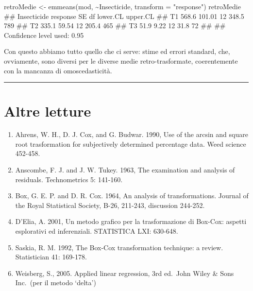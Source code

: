 \documentclass[a4paper,12pt,oneside]{book}
\providecommand{\tightlist}{%
  \setlength{\itemsep}{0pt}\setlength{\parskip}{0pt}}
\newenvironment{Shaded}{\begin{snugshade}}{\end{snugshade}}
\newcommand{\SpecialCharTok}[1]{#1}
\newcommand{\StringTok}[1]{#1}
\newcommand{\DocumentationTok}[1]{#1}
\newcommand{\OtherTok}[1]{#1}
\newcommand{\FunctionTok}[1]{#1}
\newcommand{\AttributeTok}[1]{#1}
\newcommand{\NormalTok}[1]{#1}
\begin{document}
\begin{Shaded}
\begin{Highlighting}[]
\NormalTok{retroMedie }\OtherTok{\textless{}{-}} \FunctionTok{emmeans}\NormalTok{(mod, }\SpecialCharTok{\textasciitilde{}}\NormalTok{Insecticide, }\AttributeTok{transform =} \StringTok{"response"}\NormalTok{)}
\NormalTok{retroMedie}
\DocumentationTok{\#\#  Insecticide response     SE df lower.CL upper.CL}
\DocumentationTok{\#\#  T1             568.6 101.01 12    348.5      789}
\DocumentationTok{\#\#  T2             335.1  59.54 12    205.4      465}
\DocumentationTok{\#\#  T3              51.9   9.22 12     31.8       72}
\DocumentationTok{\#\# }
\DocumentationTok{\#\# Confidence level used: 0.95}
\end{Highlighting}
\end{Shaded}

Con questo abbiamo tutto quello che ci serve: stime ed errori standard, che, ovviamente, sono diversi per le diverse medie retro-trasformate, coerentemente con la mancanza di omoscedasticità.

\begin{center}\rule{0.5\linewidth}{0.5pt}\end{center}

\hypertarget{altre-letture-7}{%
\section{Altre letture}\label{altre-letture-7}}

\begin{enumerate}
\def\labelenumi{\arabic{enumi}.}
\tightlist
\item
  Ahrens, W. H., D. J. Cox, and G. Budwar. 1990, Use of the arcsin and square root trasformation for subjectively determined percentage data. Weed science 452-458.
\item
  Anscombe, F. J. and J. W. Tukey. 1963, The examination and analysis of residuals. Technometrics 5: 141-160.
\item
  Box, G. E. P. and D. R. Cox. 1964, An analysis of transformations. Journal of the Royal Statistical Society, B-26, 211-243, discussion 244-252.
\item
  D'Elia, A. 2001, Un metodo grafico per la trasformazione di Box-Cox: aspetti esplorativi ed inferenziali. STATISTICA LXI: 630-648.
\item
  Saskia, R. M. 1992, The Box-Cox transformation technique: a review. Statistician 41: 169-178.
\item
  Weisberg, S., 2005. Applied linear regression, 3rd ed.~John Wiley \& Sons Inc.~(per il metodo `delta')
\end{enumerate}
\end{document}
